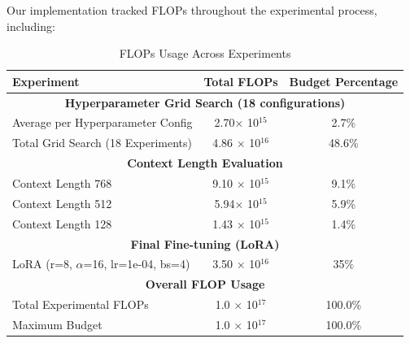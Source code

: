 \documentclass{article}
\begin{document}
Our implementation tracked FLOPs throughout the experimental process, including:
\begin{table}[h]
    \centering
    \begin{tabular}{lcc}
    \hline
    \textbf{Experiment} & \textbf{Total FLOPs} & \textbf{Budget Percentage} \\
    \hline
    \multicolumn{3}{c}{\textbf{Hyperparameter Grid Search (18 configurations)}} \\
    \hline
    Average per Hyperparameter Config & 2.70$\times$ 10$^{15}$ & 2.7\% \\
    Total Grid Search (18 Experiments) & 4.86 $\times$ 10$^{16}$ & 48.6\% \\
    \hline
    \multicolumn{3}{c}{\textbf{Context Length Evaluation}} \\
    \hline
    Context Length 768 & 9.10 $\times$ 10$^{15}$ & 9.1\% \\
    Context Length 512 & 5.94$\times$ 10$^{15}$ & 5.9\% \\
    Context Length 128 & 1.43 $\times$ 10$^{15}$ & 1.4\% \\
    \hline
    \multicolumn{3}{c}{\textbf{Final Fine-tuning (LoRA)}} \\
    \hline
    LoRA (r=8, $\alpha$=16, lr=1e-04, bs=4) & 3.50 $\times$ 10$^{16}$ & 35\% \\
    \hline
    \multicolumn{3}{c}{\textbf{Overall FLOP Usage}} \\
    \hline
    Total Experimental FLOPs & 1.0 $\times$ 10$^{17}$ & 100.0\% \\
    Maximum Budget & 1.0 $\times$ 10$^{17}$ & 100.0\% \\
    \hline
    \end{tabular}
    \caption{FLOPs Usage Across Experiments}
    \label{tab:flops_usage}
    \end{table}
    



\end{document}
